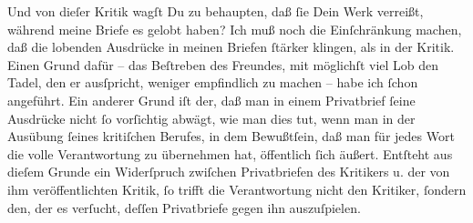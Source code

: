 \pstart
           Und von dieſer Kritik wagſt
               Du zu behaupten, daß{ }ſie  Dein Werk verreißt, während meine Briefe es
               gelobt haben? Ich muß noch die Einſchränkung machen, daß die lobenden Ausdrücke in
               meinen Briefen \strikeout{\textcolor{gray}{×}\-\textcolor{gray}{×}\-\textcolor{gray}{×}\-\textcolor{gray}{×}}{ }ſtärker klingen, als in der Kritik. \strikeout{\textcolor{gray}{×}} Einen Grund dafür – das Beſtreben des Freundes, mit möglichſt viel {\pb}Lob den Tadel, den er ausſpricht, weniger
               empfindlich zu machen – habe ich{ }ſchon angeführt. Ein anderer Grund iſt der, daß man
               in einem Privatbrief{ }ſeine Ausdrücke nicht{ }ſo vorſichtig abwägt, wie man dies tut,
               wenn man in der Ausübung{ }ſeines kritiſchen Berufes, \strikeout{\textcolor{gray}{×}\-\textcolor{gray}{×}\-\textcolor{gray}{×}} in dem Bewußtſein, daß man für jedes Wort die volle Verantwortung zu
               übernehmen hat, \strikeout{\textcolor{gray}{vor}} öffentlich{ }ſich äußert. Entſteht aus dieſem Grunde ein Widerſpruch zwiſchen
               Privatbriefen des Kritikers u. der von ihm {\pb}veröffentlichten Kritik,{ }ſo trifft die Verantwortung nicht den Kritiker,{ }ſondern
               den, der es verſucht,  deſſen Privatbriefe gegen ihn
               auszuſpielen.\pend
           
